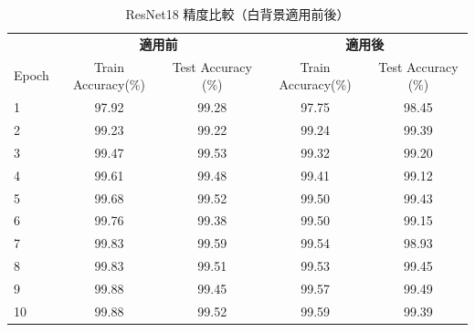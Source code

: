 \documentclass[a4paper,11pt,titlepage]{jsarticle}
\begin{document}
\begin{table}[H]
\centering
\caption{ResNet18 精度比較（白背景適用前後）}
\label{tab:comparison_resnet18}
\begin{tabular}{l|cc|cc}
\hline
      & \multicolumn{2}{c|}{\textbf{適用前 }} & \multicolumn{2}{c}{\textbf{適用後 }} \\ \cline{2-5} 
Epoch & Train Accuracy(\%) & Test Accuracy (\%) & Train Accuracy(\%) & Test Accuracy (\%) \\
\hline
1     & 97.92           & 99.28                & 97.75           & 98.45                \\
2     & 99.23           & 99.22                & 99.24           & 99.39                \\
3     & 99.47           & 99.53                & 99.32           & 99.20                \\
4     & 99.61           & 99.48                & 99.41           & 99.12                \\
5     & 99.68           & 99.52                & 99.50           & 99.43                \\
6     & 99.76           & 99.38                & 99.50           & 99.15                \\
7     & 99.83           & 99.59                & 99.54           & 98.93                \\
8     & 99.83           & 99.51                & 99.53           & 99.45                \\
9     & 99.88           & 99.45                & 99.57           & 99.49                \\
10    & 99.88           & 99.52                & 99.59           & 99.39                \\
\hline
\end{tabular}
\end{table}
\end{document}
